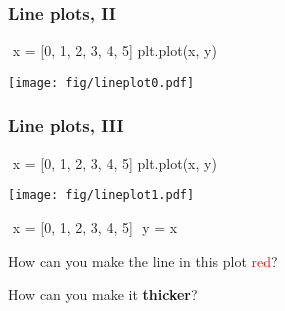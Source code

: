 \documentclass[english,serif,mathserif,xcolor=pdftex,dvipsnames,table]{beamer}
\begin{document}
\begin{frame}[fragile]
  \frametitle{Line plots, II}
\begin{semiverbatim}\small
\In \,\,x = [0, 1, 2, 3, 4, 5]
\In {}
\In plt.plot(x, y)
\end{semiverbatim}
  \begin{center}
    \texttt{[image: fig/lineplot0.pdf]}
  \end{center}
\end{frame}


\begin{frame}[fragile]
  \frametitle{Line plots, III}
\begin{semiverbatim}\small
\In \,\,x = [0, 1, 2, 3, 4, 5]
\In {}
\In plt.plot(x, y)
\end{semiverbatim}
  \begin{center}
    \texttt{[image: fig/lineplot1.pdf]}
  \end{center}
\end{frame}


\begin{frame}[fragile]
  \begin{exercise*}[3.G]

\begin{semiverbatim}\small
\In \,\,x = [0, 1, 2, 3, 4, 5]
\In \,\,y = x
\In {}
\end{semiverbatim}

    How can you make the line in this plot \textcolor{red}{red}?

    \+
    How can you make it \textbf{thicker}?
  \end{exercise*}
\end{frame}





\end{document}
